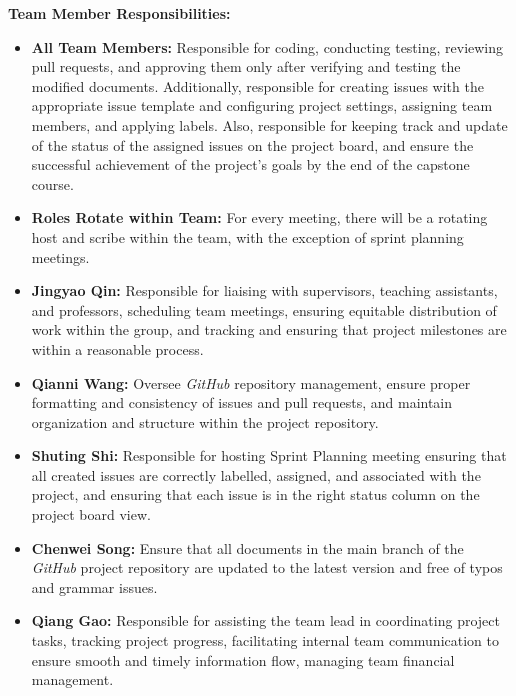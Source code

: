 \documentclass{article}
\begin{document}
\textbf{Team Member Responsibilities:}
\begin{itemize}
	\item \textbf{All Team Members:} Responsible for coding, conducting testing, reviewing pull requests, and approving them only after verifying and testing the modified documents. Additionally, responsible for creating issues with the appropriate issue template and configuring project settings, assigning team members, and applying labels. Also, responsible for keeping track and update of the status of the assigned issues on the project board, and ensure the successful achievement of the project's goals by the end of the capstone course.
	\item \textbf{Roles Rotate within Team:} For every meeting, there will be a rotating host and scribe within the team, with the exception of sprint planning meetings.
    \item \textbf{Jingyao Qin:} Responsible for liaising with supervisors, teaching assistants, and professors, scheduling team meetings, ensuring equitable distribution of work within the group, and tracking and ensuring that project milestones are within a reasonable process.
    \item \textbf{Qianni Wang:} Oversee \textit{GitHub} repository management, ensure proper formatting and consistency of issues and pull requests, and maintain organization and structure within the project repository.
    \item \textbf{Shuting Shi:} Responsible for hosting  Sprint Planning meeting ensuring that all created issues are correctly labelled, assigned, and associated with the project, and ensuring that each issue is in the right status column on the project board view.
    \item \textbf{Chenwei Song:} Ensure that all documents in the main branch of the \textit{GitHub} project repository are updated to the latest version and free of typos and grammar issues.
    \item \textbf{Qiang Gao:} Responsible for assisting the team lead in coordinating project tasks, tracking project progress, facilitating internal team communication to ensure smooth and timely information flow, managing team financial management.
    
\end{itemize}
\end{document}
